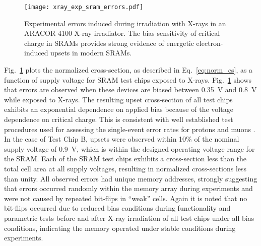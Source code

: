 \begin{figure}[tb]
    \centering
        \texttt{[image: xray\_exp\_sram\_errors.pdf]}
    \caption{Experimental errors induced during irradiation with X-rays in an ARACOR 4100 X-ray irradiator. The bias sensitivity of critical charge in SRAMs provides strong evidence of energetic electron-induced upsets in modern SRAMs.}
    \label{fig:xray_exp_seus}
\end{figure}
Fig.~\ref{fig:xray_exp_seus} plots the normalized cross-section, as described in Eq.~\ref{eq:norm_cs}, as a function of supply voltage for SRAM test chips exposed to X-rays.
Fig.~\ref{fig:xray_exp_seus} shows that errors are observed when these devices are biased between 0.35~V and 0.8~V while exposed to X-rays. 
The resulting upset cross-section of all test chips exhibits an exponential dependence on applied bias because of the voltage dependence on critical charge. 
This is consistent with well established test procedures used for assessing the single-event error rates for protons and muons \cite{Rodbell:2007vl, Sierawski:2010cj}. 
In the case of Test Chip B, upsets were observed within 10\% of the nominal supply voltage of 0.9~V, which is within the designed operating voltage range for the SRAM. 
Each of the SRAM test chips exhibits a cross-section less than the total cell area at all supply voltages, resulting in normalized cross-sections less than unity.
All observed errors had unique memory addresses, strongly suggesting that errors occurred randomly within the memory array during experiments and were not caused by repeated bit-flips in ``weak'' cells.
Again it is noted that no bit-flips occurred due to reduced bias conditions during functionality and parametric tests before and after X-ray irradiation of all test chips under all bias conditions, indicating the memory operated under stable conditions during experiments.

